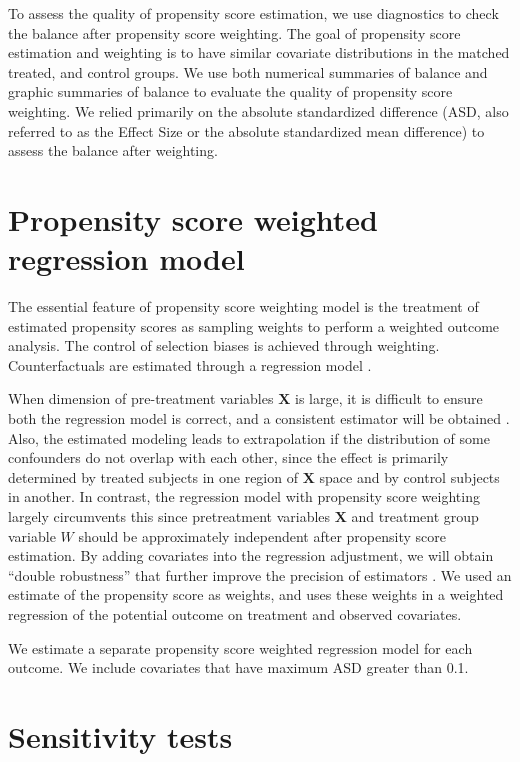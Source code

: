 \documentclass[12pt]{report}
\begin{document}
To assess the quality of propensity score estimation, we use diagnostics to check the balance after propensity score weighting. The goal of propensity score estimation and weighting is to have similar covariate distributions in the matched treated, and control groups. We use both numerical summaries of balance and graphic summaries of balance to evaluate the quality of propensity score weighting. We relied primarily on the absolute standardized difference (ASD, also referred to as the Effect Size or the absolute standardized mean difference) to assess the balance after weighting. 

\section{Propensity score weighted regression model}
The essential feature of propensity score weighting model is the treatment of estimated propensity scores as sampling weights to perform a weighted outcome analysis. The control of selection biases is achieved through weighting. Counterfactuals are estimated through a regression model \citep{guo2009propensity}.

When dimension of pre-treatment variables $\textbf{X}$ is large, it is difficult to ensure both the regression model is correct, and a consistent estimator will be obtained \citep{rubin1997estimating}. Also, the estimated modeling leads to extrapolation if the distribution of some confounders do not overlap with each other, since the effect is primarily determined by treated subjects in one region of $\textbf{X}$ space and by control subjects in another. In contrast, the regression model with propensity score weighting largely circumvents this since pretreatment variables $\textbf{X}$ and treatment group variable $W$ should be approximately independent after propensity score estimation. By adding covariates into the regression adjustment, we will obtain ``double robustness'' that further improve the precision of estimators \citep{lunceford2004stratification}. We used an estimate of the propensity score as weights, and uses these weights in a weighted regression of the potential outcome on treatment and observed covariates.

We estimate a separate propensity score weighted regression model for each outcome. We include covariates that have maximum ASD greater than 0.1. 

\section{Sensitivity tests}
\end{document}
